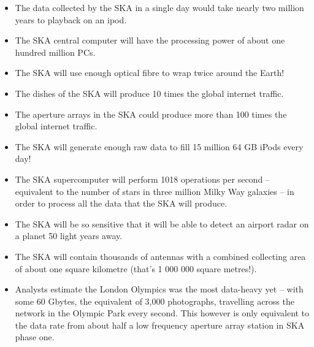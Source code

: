 \begin{itemize}

\item The data collected by the SKA in a single day would take nearly two million years to playback on an ipod.
\item The SKA central computer will have the processing power of about one hundred million PCs.
\item The SKA will use enough optical fibre to wrap twice around the Earth!
\item The dishes of the SKA will produce 10 times the global internet traffic.
\item The aperture arrays in the SKA could produce more than 100 times the global internet traffic.
\item The SKA will generate enough raw data to fill 15 million 64 GB iPods every day!
\item The SKA supercomputer will perform 1018 operations per second – equivalent to the number of stars in three million Milky Way galaxies – in order to process all the data that the SKA will produce.
\item The SKA will be so sensitive that it will be able to detect an airport radar on a planet 50 light years away.
\item The SKA will contain thousands of antennas with a combined collecting area of about one square kilometre (that’s 1 000 000 square metres!).
\item Analysts estimate the London Olympics was the most data-heavy yet – with some 60 Gbytes, the equivalent of 3,000 photographs, travelling across the network in the Olympic Park every second. This however is only equivalent to the data rate from about half a low frequency aperture array station in SKA phase one.

\end{itemize}